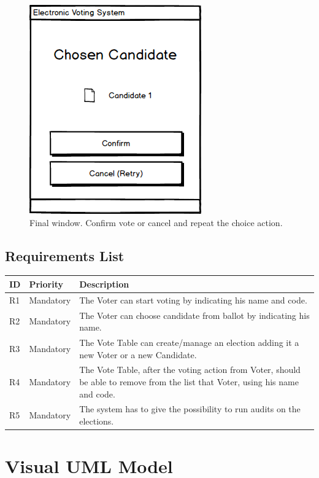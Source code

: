 \documentclass{article}
\begin{document}
\begin{figure}[H]
\centering
	\includegraphics[scale=0.5]{3.png}
	\caption{Final window. Confirm vote or cancel and repeat the choice action.}
	\label{fig:PropProf}
\end{figure}



\subsection{Requirements List}

\begin{center}
    \begin{tabular}{ | l | l  | p{9cm} |}
    \hline
    ID	& Priority & Description \\ \hline
    R1 &	Mandatory&	The Voter can start voting by indicating his name and code. \\ \hline
   R2& Mandatory&The Voter can choose candidate from ballot by indicating his name.\\ \hline
    R3	&Mandatory&	The Vote Table can create/manage an election adding it a new Voter or a new Candidate. \\ \hline
  R4&Mandatory&The Vote Table, after the voting action from Voter, should be able to remove from the list that Voter, using his name and code.  \\ \hline
  R5 & Mandatory & The system has to give the possibility to run audits on the elections. \\\hline
    \end{tabular}
\end{center}

\section{Visual UML Model}
\end{document}
